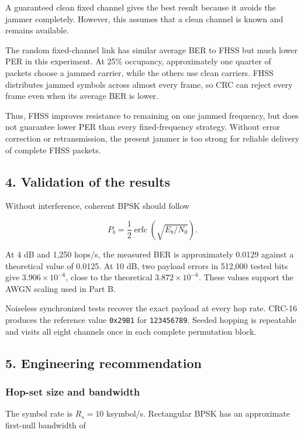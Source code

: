 \documentclass[
  11pt,
]{article}
\begin{document}
A guaranteed clean fixed channel gives the best result because it avoids
the jammer completely. However, this assumes that a clean channel is
known and remains available.

The random fixed-channel link has similar average BER to FHSS but much
lower PER in this experiment. At 25\% occupancy, approximately one
quarter of packets choose a jammed carrier, while the others use clean
carriers. FHSS distributes jammed symbols across almost every frame, so
CRC can reject every frame even when its average BER is lower.

Thus, FHSS improves resistance to remaining on one jammed frequency, but
does not guarantee lower PER than every fixed-frequency strategy.
Without error correction or retransmission, the present jammer is too
strong for reliable delivery of complete FHSS packets.

\subsection{4. Validation of the
results}\label{validation-of-the-results}

Without interference, coherent BPSK should follow

\[P_b=\frac{1}{2}\operatorname{erfc}\left(\sqrt{E_b/N_0}\right).\]

At 4 dB and 1,250 hops/s, the measured BER is approximately 0.0129
against a theoretical value of 0.0125. At 10 dB, two payload errors in
512,000 tested bits give \(3.906\times10^{-6}\), close to the
theoretical \(3.872\times10^{-6}\). These values support the AWGN
scaling used in Part B.

Noiseless synchronized tests recover the exact payload at every hop
rate. CRC-16 produces the reference value \texttt{0x29B1} for
\texttt{123456789}. Seeded hopping is repeatable and visits all eight
channels once in each complete permutation block.

\subsection{5. Engineering
recommendation}\label{engineering-recommendation}

\subsubsection{Hop-set size and
bandwidth}\label{hop-set-size-and-bandwidth}

The symbol rate is \(R_s=10\) ksymbol/s. Rectangular BPSK has an
approximate first-null bandwidth of
\end{document}
